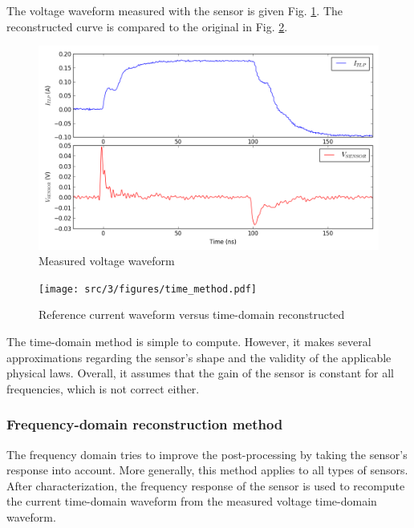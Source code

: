 The voltage waveform measured with the sensor is given Fig. \ref{fig:measurement-nfs}.
The reconstructed curve is compared to the original in Fig. \ref{fig:time-domain-reconstructed}.

\begin{figure}[!htbp]
  \centering
  \includegraphics{src/3/figures/measured_waveform.png}
  \caption{Measured voltage waveform}
  \label{fig:measurement-nfs}
\end{figure}

\begin{figure}[!htbp]
  \centering
  \texttt{[image: src/3/figures/time\_method.pdf]}
  \caption{Reference current waveform versus time-domain reconstructed}
  \label{fig:time-domain-reconstructed}
\end{figure}

The time-domain method is simple to compute.
However, it makes several approximations regarding the sensor's shape and the validity of the applicable physical laws.
Overall, it assumes that the gain of the sensor is constant for all frequencies, which is not correct either.

\subsubsection{Frequency-domain reconstruction method}

The frequency domain tries to improve the post-processing by taking the sensor's response into account.
More generally, this method applies to all types of sensors.
After characterization, the frequency response of the sensor is used to recompute the current time-domain waveform from the measured voltage time-domain waveform.

